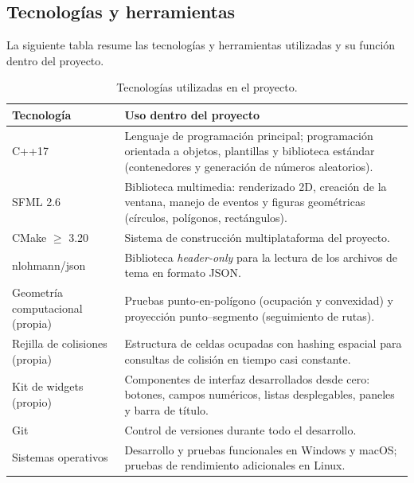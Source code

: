 \documentclass[12pt,a4paper]{article}
\begin{document}
\subsection{Tecnologías y herramientas}

La siguiente tabla resume las tecnologías y herramientas utilizadas y su función dentro del proyecto.

\begin{table}[H]
    \centering
    \caption{Tecnologías utilizadas en el proyecto.}
    \label{tab:tecnologias}
    \begin{tabularx}{\textwidth}{p{4cm} X}
        \toprule
        \textbf{Tecnología} & \textbf{Uso dentro del proyecto} \\
        \midrule

        C++17 &
        Lenguaje de programación principal; programación orientada a objetos, plantillas y biblioteca estándar (contenedores y generación de números aleatorios). \\

        SFML 2.6 &
        Biblioteca multimedia: renderizado 2D, creación de la ventana, manejo de eventos y figuras geométricas (círculos, polígonos, rectángulos). \\

        CMake $\geq$ 3.20 &
        Sistema de construcción multiplataforma del proyecto. \\

        nlohmann/json &
        Biblioteca \emph{header-only} para la lectura de los archivos de tema en formato JSON. \\

        Geometría computacional (propia) &
        Pruebas punto-en-polígono (ocupación y convexidad) y proyección punto--segmento (seguimiento de rutas). \\

        Rejilla de colisiones (propia) &
        Estructura de celdas ocupadas con hashing espacial para consultas de colisión en tiempo casi constante. \\

        Kit de widgets (propio) &
        Componentes de interfaz desarrollados desde cero: botones, campos numéricos, listas desplegables, paneles y barra de título. \\

        Git &
        Control de versiones durante todo el desarrollo. \\

        Sistemas operativos &
        Desarrollo y pruebas funcionales en Windows y macOS; pruebas de rendimiento adicionales en Linux. \\

        \bottomrule
    \end{tabularx}
\end{table}
\end{document}
